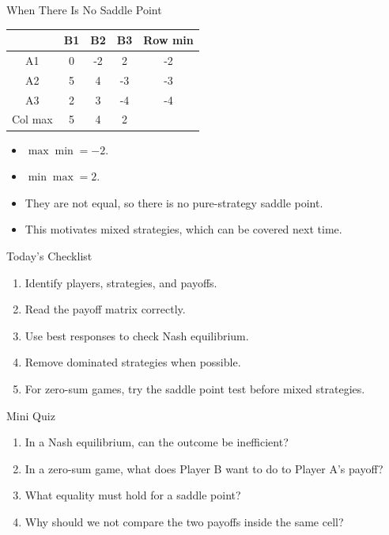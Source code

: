 \documentclass[10pt,aspectratio=169]{beamer}
\begin{document}
\begin{frame}{When There Is No Saddle Point}
\begin{center}
\begin{tabular}{c c c c c}
 & B1 & B2 & B3 & Row min\\
\midrule
A1 & 0 & -2 & 2 & -2\\
A2 & 5 & 4 & -3 & -3\\
A3 & 2 & 3 & -4 & -4\\
\midrule
Col max & 5 & 4 & 2 & \\
\end{tabular}
\end{center}
\vspace{0.2cm}
\begin{itemize}
  \item $\max \min = -2$.
  \item $\min \max = 2$.
  \item They are not equal, so there is no pure-strategy saddle point.
  \item This motivates mixed strategies, which can be covered next time.
\end{itemize}
\end{frame}

\begin{frame}{Today's Checklist}
\begin{enumerate}
  \item Identify players, strategies, and payoffs.
  \item Read the payoff matrix correctly.
  \item Use best responses to check Nash equilibrium.
  \item Remove dominated strategies when possible.
  \item For zero-sum games, try the saddle point test before mixed strategies.
\end{enumerate}
\end{frame}

\begin{frame}{Mini Quiz}
\begin{enumerate}
  \item In a Nash equilibrium, can the outcome be inefficient?
  \item In a zero-sum game, what does Player B want to do to Player A's payoff?
  \item What equality must hold for a saddle point?
  \item Why should we not compare the two payoffs inside the same cell?
\end{enumerate}
\end{frame}
\end{document}
